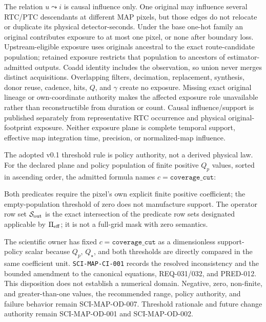 \documentclass[10pt]{article}
\newcommand{\code}[1]{\nolinkurl{#1}}
\begin{document}
\SCIMapExposureEquations

The relation \(u\leadsto i\) is causal influence only. One original may
influence several RTC/PTC descendants at different MAP pixels, but those
edges do not relocate or duplicate its physical detector-seconds. Under the
base one-hot family an original contributes exposure to at most one pixel, or
none after boundary loss. Upstream-eligible exposure uses originals ancestral
to the exact route-candidate population; retained exposure restricts that
population to ancestors of estimator-admitted outputs. Coadd identity includes
the observation, so union never merges distinct acquisitions. Overlapping
filters, decimation, replacement, synthesis, donor reuse, cadence, hits,
\(Q\), and \(\gamma\) create no exposure. Missing exact original lineage or
own-coordinate authority makes the affected exposure role unavailable rather
than reconstructible from duration or count. Causal influence/support is
published separately from representative RTC occurrence and physical
original-footprint exposure. Neither exposure plane is complete temporal
support, effective map integration time, precision, or normalized-map
influence.

The adopted v0.1 threshold rule is policy authority, not a derived physical
law. For the declared plane and policy population of finite positive \(Q_p\)
values, sorted in ascending order, the admitted formula names
\(c=\texttt{coverage\_cut}\):

\SCIMapThresholdEquations

Both predicates require the pixel's own explicit finite positive coefficient;
the empty-population threshold of zero does not manufacture support. The
operator row set \(\mathcal S_{\rm out}\) is the exact intersection of the
predicate row sets designated applicable by \(\Pi_{\rm eff}\); it is not a
full-grid mask with zero semantics.

The scientific owner has fixed \(c=\texttt{coverage\_cut}\) as a
dimensionless support-policy scalar because \(Q_p\), \(Q_\star\), and both
thresholds are directly compared in the same coefficient unit.
\code{SCI-MAP-CI-001} records the resolved inconsistency and the bounded
amendment to the canonical equations, REQ-031/032, and PRED-012. This
disposition does not establish a numerical domain. Negative, zero,
non-finite, and greater-than-one values, the recommended range, policy
authority, and failure behavior remain SCI-MAP-OD-007. Threshold rationale
and future change authority remain SCI-MAP-OD-001 and SCI-MAP-OD-002.
\end{document}
